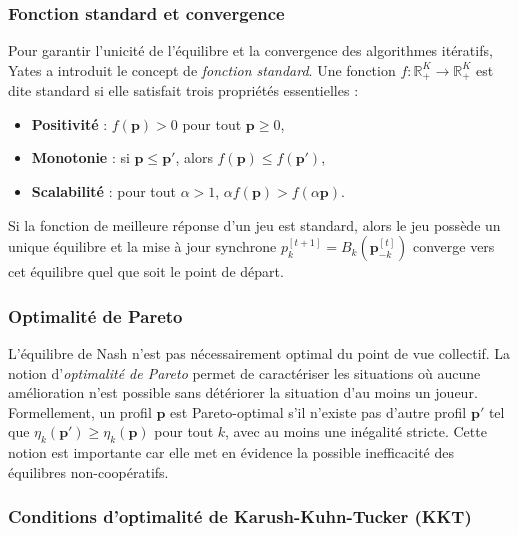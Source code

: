 \documentclass[conference]{IEEEtran}
\begin{document}
\subsubsection{Fonction standard et convergence}

Pour garantir l'unicité de l'équilibre et la convergence des algorithmes itératifs, Yates \cite{Yates1995} a introduit le concept de \textit{fonction standard}. Une fonction $f: \mathbb{R}_+^K \to \mathbb{R}_+^K$ est dite standard si elle satisfait trois propriétés essentielles :
\begin{itemize}
    \item \textbf{Positivité} : $f(\mathbf{p}) > 0$ pour tout $\mathbf{p} \geq 0$,
    \item \textbf{Monotonie} : si $\mathbf{p} \leq \mathbf{p}'$, alors $f(\mathbf{p}) \leq f(\mathbf{p}')$,
    \item \textbf{Scalabilité} : pour tout $\alpha > 1$, $\alpha f(\mathbf{p}) > f(\alpha \mathbf{p})$.
\end{itemize}
Si la fonction de meilleure réponse d'un jeu est standard, alors le jeu possède un unique équilibre et la mise à jour synchrone $p_k^{[t+1]} = B_k(\mathbf{p}_{-k}^{[t]})$ converge vers cet équilibre quel que soit le point de départ.

\subsubsection{Optimalité de Pareto}

L'équilibre de Nash n'est pas nécessairement optimal du point de vue collectif. La notion d'\textit{optimalité de Pareto} permet de caractériser les situations où aucune amélioration n'est possible sans détériorer la situation d'au moins un joueur. Formellement, un profil $\mathbf{p}$ est Pareto-optimal s'il n'existe pas d'autre profil $\mathbf{p}'$ tel que $\eta_k(\mathbf{p}') \geq \eta_k(\mathbf{p})$ pour tout $k$, avec au moins une inégalité stricte. Cette notion est importante car elle met en évidence la possible inefficacité des équilibres non-coopératifs.

\subsubsection{Conditions d'optimalité de Karush-Kuhn-Tucker (KKT)}
\end{document}
